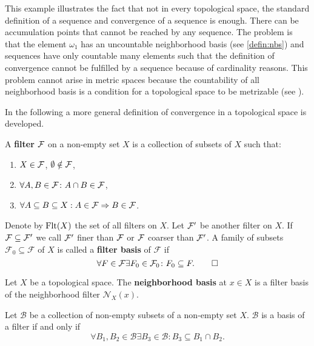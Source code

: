 This example illustrates the fact that not in every topological space, the standard definition of a sequence and convergence of a sequence is enough. There can be accumulation points that cannot be reached by any sequence. The problem is that the element $\omega_1$ has an uncountable neighborhood basis (see \ref{defin:nbs}) and sequences have only countable many elements such that the definition of convergence cannot be fulfilled by a sequence because of cardinality reasons. This problem cannot arise in metric spaces because the countability of all neighborhood basis is a condition for a topological space to be metrizable (see \cite[p. 130f]{MunTop}).

In the following a more general definition of convergence in a topological space is developed.
\begin{defin}
  A \textbf{filter} $\mathcal{F}$ on a non-empty set $X$ is a collection of subsets of $X$ such that:
  \begin{enumerate}
    \item $X \in \mathcal{F}$, $\emptyset \notin \mathcal{F}$,
    \item $\forall A, B \in \mathcal{F}\colon A\cap B \in \mathcal{F}$,
    \item $\forall A \subseteq B \subseteq X: A \in \mathcal{F} \Rightarrow B \in \mathcal{F}$.
  \end{enumerate}
  Denote by ${\rm Flt}(X)$ the set of all filters on $X$.
  Let $\mathcal{F}'$ be another filter on $X$. If $\mathcal{F} \subseteq \mathcal{F}'$ we call $\mathcal{F}'$ finer than $\mathcal{F}$ or $\mathcal{F}$ coarser than $\mathcal{F}'$. A family of subsets $\mathcal{F}_0 \subseteq \mathcal{F}$ of $X$ is called a \textbf{filter basis} of $\mathcal{F}$ if
  \begin{equation*}
    \forall F \in \mathcal{F} \exists F_0 \in \mathcal{F}_0\colon F_0 \subseteq F. \qedhere
  \end{equation*}
\end{defin}

\begin{defin}\label{defin:nbs}
  Let $X$ be a topological space. The \textbf{neighborhood basis} at $x \in X$ is a filter basis of the neighborhood filter $\mathcal{N}_X(x)$.
\end{defin}
  
\begin{lemma}\label{lem:filbas}
  Let $\mathcal{B}$ be a collection of non-empty subsets of a non-empty set $X$. $\mathcal{B}$ is a basis of a filter if and only if
  \begin{equation}\label{eq:filterbasis}
    \forall B_1, B_2 \in \mathcal{B}\exists B_3 \in \mathcal{B}: B_3 \subseteq B_1 \cap B_2.
  \end{equation}
\end{lemma}

